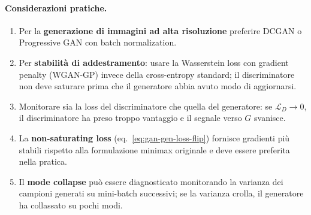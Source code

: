\paragraph{Considerazioni pratiche.}
\begin{enumerate}
  \item Per la \textbf{generazione di immagini ad alta risoluzione}
        preferire DCGAN o Progressive GAN con batch normalization.
  \item Per \textbf{stabilità di addestramento}: usare la Wasserstein
        loss con gradient penalty (WGAN-GP) invece della cross-entropy
        standard; il discriminatore non deve saturare prima che il
        generatore abbia avuto modo di aggiornarsi.
  \item Monitorare sia la loss del discriminatore che quella del
        generatore: se $\mathcal{L}_D \to 0$, il discriminatore ha
        preso troppo vantaggio e il segnale verso $G$ svanisce.
  \item La \textbf{non-saturating loss} (eq.~\ref{eq:gan-gen-loss-flip})
        fornisce gradienti più stabili rispetto alla formulazione
        minimax originale e deve essere preferita nella pratica.
  \item Il \textbf{mode collapse} può essere diagnosticato monitorando
        la varianza dei campioni generati su mini-batch successivi; se
        la varianza crolla, il generatore ha collassato su pochi modi.
\end{enumerate}
